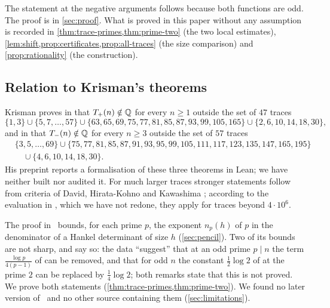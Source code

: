 The statement at the negative arguments follows because both functions are odd. The proof is in
\cref{sec:proof}. What is proved in this paper without any assumption is recorded in
\cref{thm:trace-primes,thm:prime-two} (the two local estimates),
\cref{lem:shift,prop:certificates,prop:all-traces} (the size comparison) and
\cref{prop:rationality} (the construction).

\subsection{Relation to Krisman's theorems}\label{subsec:background}

Krisman proves in \cite[Theorems~1.1 and~1.3, Corollary~1.4]{Krisman2026units} that
$T_+(n)\notin\mathbb{Q}$ for every $n\ge1$ outside the set of $47$ traces
\begin{equation}\label{eq:excluded-chi}
\{1,3\}\cup\{5,7,\dots,57\}\cup\{63,65,69,75,77,81,85,87,93,99,105,165\}\cup\{2,6,10,14,18,30\},
\end{equation}
and in \cite[Theorem~1.5]{Krisman2026units} that $T_-(n)\notin\mathbb{Q}$ for every $n\ge3$ outside the
set of $57$ traces
\begin{equation}\label{eq:excluded-ti}
\begin{aligned}
&\{3,5,\dots,69\}\cup\{75,77,81,85,87,91,93,95,99,105,111,117,123,135,147,165,195\}\\
&\quad\cup\{4,6,10,14,18,30\}.
\end{aligned}
\end{equation}
His preprint reports a formalisation of these three theorems in Lean; we have neither built nor
audited it. For much larger traces stronger statements follow from criteria of David,
Hirata-Kohno and Kawashima \cite{DHK2020Moscow,DHK2022Acta}; according to the evaluation in
\cite[Sections~9.2 and~9.3]{Krisman2026units}, which we have not redone, they apply for traces
beyond $4\cdot10^{6}$.

The proof in~\Kri{} bounds, for each prime $p$, the exponent $n_p(h)$ of $p$ in the denominator
of a Hankel determinant of size $h$ (\cref{sec:pencil}). Two of its bounds are not sharp, and
\cite[Remarks~7.2 and~8.3]{Krisman2026units} say so: the data ``suggest'' that at an odd prime
$p\mid n$ the term $\frac{\log p}{4(p-1)}$ of \cite[Lemma~3.8]{Krisman2026units} can be
removed, and that for odd $n$ the constant $\frac12\log2$ of
\cite[Lemma~8.1]{Krisman2026units} at the prime $2$ can be replaced by $\frac14\log2$; both
remarks state that this is not proved. We prove both statements
(\cref{thm:trace-primes,thm:prime-two}). We found no later version of~\Kri{} and no other source
containing them (\cref{sec:limitations}).


